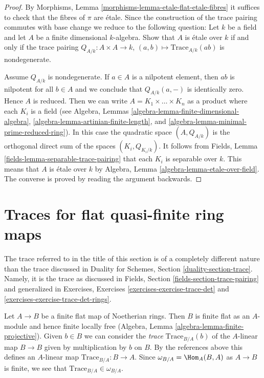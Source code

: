 \begin{proof}
By Morphisms, Lemma \ref{morphisms-lemma-etale-flat-etale-fibres}
it suffices to check that the fibres of $\pi$ are \'etale.
Since the construction of the trace pairing commutes with base
change we reduce to the following question: Let $k$ be a field
and let $A$ be a finite dimensional $k$-algebra. Show that
$A$ is \'etale over $k$ if and only if the trace pairing
$Q_{A/k} : A \times A \to k$, $(a, b) \mapsto \text{Trace}_{A/k}(ab)$
is nondegenerate.

\medskip\noindent
Assume $Q_{A/k}$ is nondegenerate. If $a \in A$ is a nilpotent element, then
$ab$ is nilpotent for all $b \in A$ and we conclude that $Q_{A/k}(a, -)$ is
identically zero. Hence $A$ is reduced. Then we can write
$A = K_1 \times \ldots \times K_n$ as a product where each $K_i$
is a field (see
Algebra, Lemmas \ref{algebra-lemma-finite-dimensional-algebra},
\ref{algebra-lemma-artinian-finite-length}, and
\ref{algebra-lemma-minimal-prime-reduced-ring}).
In this case the quadratic
space $(A, Q_{A/k})$ is the orthogonal direct sum of the spaces
$(K_i, Q_{K_i/k})$. It follows from
Fields, Lemma \ref{fields-lemma-separable-trace-pairing}
that each $K_i$ is separable over $k$. This means that $A$ is \'etale
over $k$ by Algebra, Lemma \ref{algebra-lemma-etale-over-field}.
The converse is proved by reading the argument backwards.
\end{proof}

\section{Traces for flat quasi-finite ring maps}
\label{discriminant-section-quasi-finite-traces}
The trace referred to in the title of this section is of a completely
different nature than the trace discussed in
Duality for Schemes, Section \ref{duality-section-trace}.
Namely, it is the trace
as discussed in Fields, Section \ref{fields-section-trace-pairing}
and generalized in Exercises, Exercises \ref{exercises-exercise-trace-det} and
\ref{exercises-exercise-trace-det-rings}.

\medskip\noindent
Let $A \to B$ be a finite flat map of Noetherian rings. Then $B$ is finite
flat as an $A$-module and hence finite locally free
(Algebra, Lemma \ref{algebra-lemma-finite-projective}).
Given $b \in B$ we can consider the {\it trace} $\text{Trace}_{B/A}(b)$
of the $A$-linear map $B \to B$ given by
multiplication by $b$ on $B$. By the references above this defines
an $A$-linear map $\text{Trace}_{B/A} : B \to A$.
Since $\omega_{B/A} = \Hom_A(B, A)$ as $A \to B$ is finite, we see
that $\text{Trace}_{B/A} \in \omega_{B/A}$.

